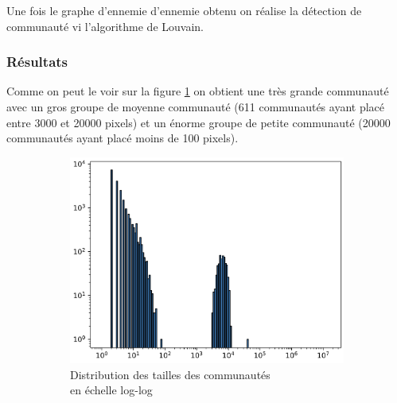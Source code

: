 \documentclass[a4paper]{article}
\begin{document}
{Une fois le graphe d'ennemie d'ennemie obtenu on réalise la détection de communauté vi l'algorithme de Louvain.

\subsubsection{Résultats}
Comme on peut le voir sur la figure \ref{fig:communities_sizes_ennemies} on obtient une très grande communauté avec un gros groupe de moyenne communauté (611 communautés ayant placé entre 3000 et 20000 pixels) et un énorme groupe de petite communauté (20000 communautés ayant placé moins de 100 pixels). 
\begin{figure}[h]
    \captionsetup[subfigure]{justification=centering}
    \begin{subfigure}{.55\linewidth}
        \includegraphics[width=\linewidth]{communities_sizes_ennemies.png}
        \caption{Distribution des tailles des communautés \\en échelle log-log}
        \label{fig:communities_sizes_ennemies}
    \end{subfigure}
    \begin{subfigure}{.4\linewidth}

\end{subfigure}
\end{figure}}
\end{document}
